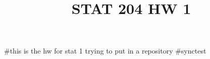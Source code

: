 \documentclass[
  letterpaper,
  DIV=11,
  numbers=noendperiod]{scrartcl}
\title{STAT 204 HW 1}
\author{}
\date{}
\begin{document}
\maketitle


\#this is the hw for stat 1 trying to put in a repository \#synctest
\end{document}
